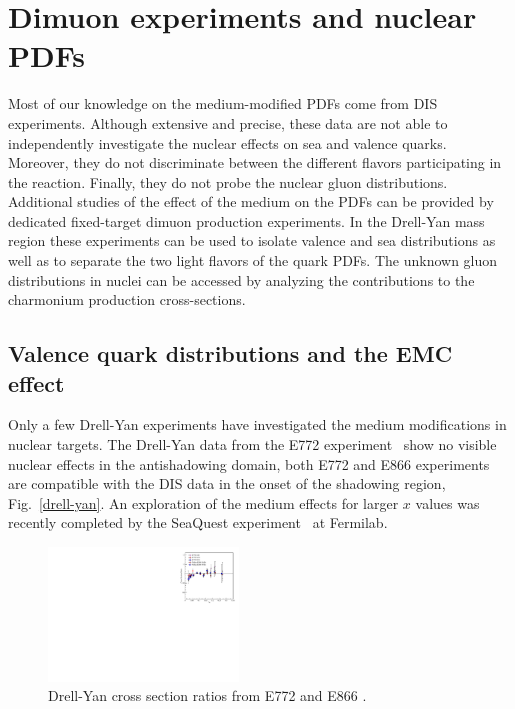 \section{Dimuon experiments and nuclear PDFs}

Most of our knowledge on the medium-modified PDFs come from DIS experiments. Although extensive and precise, 
these data are not able to independently investigate the nuclear effects on sea and valence quarks.  
Moreover, they do not discriminate between the different flavors participating in the reaction. Finally, 
they do not probe the nuclear gluon distributions. Additional studies of the effect of the medium on the 
PDFs can be provided by dedicated fixed-target dimuon production experiments. In the Drell-Yan mass region
 these experiments can be used to isolate  
valence and sea distributions as well as to separate the two light flavors of the quark PDFs. 
The unknown gluon distributions in nuclei can be accessed by analyzing the contributions to  
the charmonium production cross-sections. 
 
\subsection {Valence quark distributions and the EMC effect}
Only a few Drell-Yan experiments have investigated the medium modifications in nuclear targets. 
The Drell-Yan data from the E772 experiment~\cite{Alde:1990im} show no visible nuclear effects in 
the antishadowing domain, both E772 and E866 experiments~\cite{Vasilev:1999fa} are compatible 
with the DIS data in the onset of the shadowing region, Fig.~\ref{drell-yan}.  An exploration of the medium effects for larger $x$ 
values was recently completed by the SeaQuest experiment~\cite{Arrington:2006} at Fermilab. 

\begin{center}
\begin{figure}[htb]
  \includegraphics[width=0.45\textwidth]{plots/Drell-Yan_EMC.pdf}
  \caption{Drell-Yan cross section ratios from E772 and E866 \cite{Alde:1990im, Vasilev:1999fa}.}
  \label{fig:drell-yan}
\end{figure}
\end{center}


